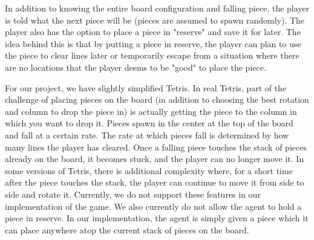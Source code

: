 \documentclass[11pt]{article}
\begin{document}
\bigskip

In addition to knowing the entire board configuration and falling piece, the player is told what the next piece will be (pieces are assumed to spawn randomly). The player also has the option to place a piece in "reserve" and save it for later. The idea behind this is that by putting a piece in reserve, the player can plan to use the piece to clear lines later or temporarily escape from a situation where there are no locations that the player deems to be "good" to place the piece.

\bigskip

For our project, we have slightly simplified Tetris. In real Tetris, part of the challenge of placing pieces on the board (in addition to choosing the best rotation and column to drop the piece in) is actually getting the piece to the column in which you want to drop it. Pieces spawn in the center at the top of the board and fall at a certain rate. The rate at which pieces fall is determined by how many lines the player has cleared. Once a falling piece touches the stack of pieces already on the board, it becomes stuck, and the player can no longer move it. In some versions of Tetris, there is additional complexity where, for a short time after the piece touches the stack, the player can continue to move it from side to side and rotate it. Currently, we do not support these features in our implementation of the game. We also currently do not allow the agent to hold a piece in reserve. In our implementation, the agent is simply given a piece which it can place anywhere atop the current stack of pieces on the board.
\end{document}
